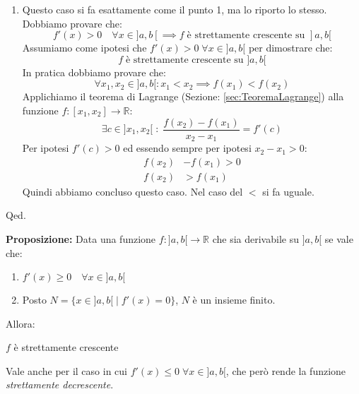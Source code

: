{\begin{enumerate}
		\item Questo caso si fa esattamente come il punto 1, ma lo riporto lo stesso. Dobbiamo provare che:
			\begin{equation*}
				f'(x) > 0 \quad \forall x \in ]a,b[ \implies f \; \text{è strettamente crescente su } ]a,b[
			\end{equation*}
			Assumiamo come ipotesi che  $f'(x) > 0 \; \forall x \in ]a,b[$ per dimostrare che:
			\begin{equation*}
				f \; \text{è strettamente crescente su } ]a,b[
			\end{equation*}
			In pratica dobbiamo provare che:
			\begin{equation*}
				\forall x_1, x_2 \in ]a,b[ : x_1 < x_2 \implies f(x_1) < f(x_2)
			\end{equation*}
			Applichiamo il teorema di Lagrange (Sezione: \ref{sec:TeoremaLagrange}) alla funzione $f:[x_1, x_2] \to \mathbb{R}$:
			\begin{equation*}
				\exists c \in ]x_1, x_2[ \; : \; \dfrac{f(x_2) - f(x_1)}{x_2 - x_1} = f'(c)
			\end{equation*}
			Per ipotesi $f'(c) > 0$ ed essendo sempre per ipotesi $x_2 - x_1 > 0$:
			\begin{align*}
				f(x_2) &- f(x_1) > 0\\[10pt]
				f(x_2) &> f(x_1)
			\end{align*}
			Quindi abbiamo concluso questo caso. Nel caso del $<$ si fa uguale.\\
	\end{enumerate}
	\hfill Qed.
}

\textbf{Proposizione:} Data una funzione $f:]a,b[ \to \mathbb{R}$ che sia derivabile su $]a,b[$ se vale che:
\begin{enumerate}
	\item $f'(x) \geq 0 \quad \forall x \in ]a,b[$ 
	
	\item Posto $N = \{x \in ]a,b[ \; | \; f'(x) = 0\}$, $N$ è un insieme finito.
\end{enumerate}
Allora:
\begin{center}
	$f$ è strettamente crescente
\end{center}
Vale anche per il caso in cui $f'(x) \leq 0 \; \forall x \in ]a,b[$, che però rende la funzione \textit{strettamente decrescente}.

